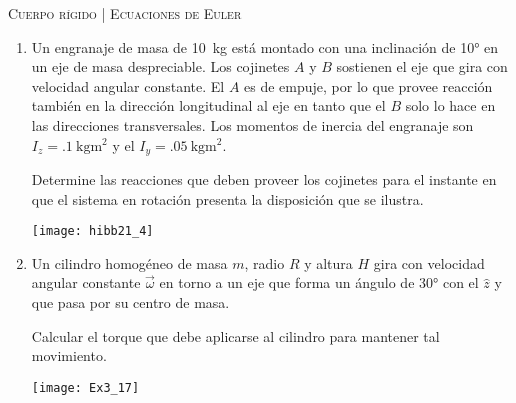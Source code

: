 \documentclass[11pt, spanish, a4paper, twoside]{article}
\begin{document}
\begin{center}
  \textsc{\large Cuerpo rígido | Ecuaciones de Euler}
\end{center}


\begin{enumerate}


\item 
\begin{minipage}[t][5cm]{0.55\textwidth}
Un engranaje de masa de \SI{10}{\kilo\gram} está montado con una inclinación de \ang{10;;} en un eje de masa despreciable.
Los cojinetes \(A\) y \(B\) sostienen el eje que gira con velocidad angular constante.
El \(A\) es de empuje, por lo que provee reacción también en la dirección longitudinal al eje en tanto que el \(B\) solo lo hace en las direcciones transversales.
Los momentos de inercia del engranaje son \(I_z = \SI{.1}{\kilo\gram\metre\squared}\) y el \(I_y = \SI{.05}{\kilo\gram\metre\squared}\).
\begin{tasks} 
	\task Determine las reacciones que deben proveer los cojinetes para el instante en que el sistema en rotación presenta la disposición que se ilustra.
\end{tasks}
\end{minipage}
\begin{minipage}[c][0.5cm][t]{0.4\textwidth}
	\texttt{[image: hibb21\_4]}
\end{minipage}




\item 
\begin{minipage}[t][3cm]{0.75\textwidth}
Un cilindro homogéneo de masa \(m\), radio \(R\) y altura \(H\) gira con velocidad angular constante \(\vec{\omega}\) en torno a un eje que forma un ángulo de \ang{30;;} con el \(\hat{z}\) y que pasa por su centro de masa. 
\begin{tasks} 
	\task Calcular el torque que debe aplicarse al cilindro para mantener tal movimiento.
\end{tasks}
\end{minipage}
\begin{minipage}[c][2cm][t]{0.2\textwidth}
	\texttt{[image: Ex3\_17]}
\end{minipage}





\end{enumerate}
\end{document}
